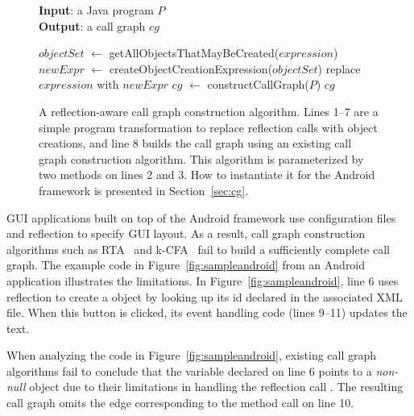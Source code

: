 \begin{figure}[t]
\vspace{3mm}
\textbf{Input}: a Java program $\mathit{P}$\\
\textbf{Output}: a call graph $\mathit{cg}$\\
\vspace{-4mm}
\begin{algorithmic}[1]
\STATE $\mathit{objectSet}$ $\leftarrow$ getAllObjectsThatMayBeCreated($\mathit{expression}$)
\STATE $\mathit{newExpr}$ $\leftarrow$ createObjectCreationExpression($\mathit{objectSet}$)
\STATE replace $\mathit{expression}$ with $\mathit{newExpr}$
\ENDIF
\ENDFOR
\STATE $\mathit{cg}$ $\leftarrow$ constructCallGraph($\mathit{P}$)
\RETURN $\mathit{cg}$
\end{algorithmic}
\vspace{-3mm}
\caption{A reflection-aware call graph construction algorithm. Lines
1--7 are a simple program transformation to replace reflection calls
with object creations, and line 8 builds the call graph using
an existing call graph construction algorithm. This algorithm
is parameterized by two methods on lines 2 and 3. 
How to instantiate it for the Android framework is presented in Section~\ref{sec:cg}.
} 
\label{fig:cgalgorithm}
\end{figure}

GUI applications built on top of the Android framework
use configuration files and reflection to specify GUI layout.
As a result, call graph construction algorithms such as RTA~\cite{rta}
and k-CFA~\cite{kcfa} fail to build a sufficiently complete call graph.
The example code in Figure~\ref{fig:sampleandroid} from an Android application
 illustrates the limitations.
In Figure~\ref{fig:sampleandroid}, line 6 uses reflection to create a 
object by looking up its id declared in the associated XML file. When this button
is clicked, its event handling code (lines 9--11) updates the text.

When analyzing the code in Figure~\ref{fig:sampleandroid}, existing call graph algorithms
fail to conclude that the variable  declared on line 6
points to a \textit{non-null}  object due to their limitations in handling the
reflection call . The resulting call graph
omits the edge corresponding to the  method call on line 10.

